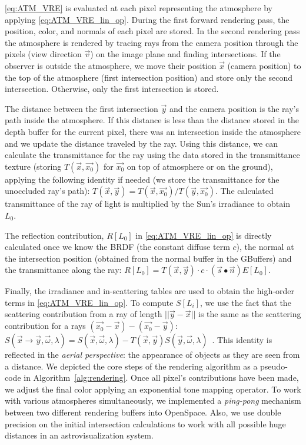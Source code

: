 \documentclass[journal]{vgtc}                %
\newcommand{\review}[1]{{\color{blue}#1}}
\begin{document}
\autoref{eq:ATM_VRE} is evaluated at each pixel representing the atmosphere by applying \autoref{eq:ATM_VRE_lin_op}. During the first forward rendering pass, the position, color, and normals of each pixel are stored. In the second rendering pass the atmosphere is rendered by tracing rays from the camera position through the pixels (view direction $\vec{v}$) on the image plane and finding intersections. If the observer is outside the atmosphere, we move their position $\vec{x}$ (camera position) to the top of the atmosphere (first intersection position) and store only the second intersection. Otherwise, only the first intersection is stored.

The distance between the first intersection $\vec{y}$ and the camera position is the ray's path inside the atmosphere. If this distance is less than the distance stored in the depth buffer for the current pixel, there was an intersection inside the atmosphere and we update the distance traveled by the ray. Using this distance, we can calculate the transmittance for the ray using the data stored in the transmittance texture (storing $T(\vec{x}, \vec{x_0})$ for $\vec{x_0}$ on top of atmosphere or on the ground), applying the following identity if needed (we store the transmittance for the unoccluded ray's path): $T(\vec{x}, \vec{y}) = T(\vec{x}, \vec{x_0}) / T(\vec{y}, \vec{x_0})$. The calculated transmittance of the ray of light is multiplied by the Sun's irradiance to obtain $L_0$.

The reflection contribution, $R[L_0]$ in \autoref{eq:ATM_VRE_lin_op} is directly calculated once we know the BRDF (the constant diffuse term $c$), the normal at the intersection position (obtained from the normal buffer in the GBuffers) and the transmittance along the ray: $R[L_0] = T(\vec{x}, \vec{y}) \cdot c \cdot (\vec{s}\bullet\vec{n})E[L_0]$.

Finally, the irradiance and in-scattering tables are used to obtain the high-order terms in \autoref{eq:ATM_VRE_lin_op}. To compute $S[L_i]$, we use \review{the fact that} the scattering contribution from a ray of length $||\vec{y}-\vec{x}||$ is the same as the scattering contribution for a rays $(\vec{x_0}-\vec{x}) - (\vec{x_0}-\vec{y})$:  $S(\vec{x}\rightarrow \vec{y}, \vec{\omega}, \lambda) = S(\vec{x}, \vec{\omega}, \lambda) - T(\vec{x}, \vec{y})S(\vec{y}, \vec{\omega}, \lambda)$~\cite{ONeil:2005, Schafhitzel:2007}. This identity is reflected in the \textit{aerial perspective}: the appearance of objects as they are seen from a distance. \review{We depicted the core steps of the rendering algorithm as a pseudo-code in Algorithm~\autoref{alg:rendering}.} \review{Once all pixel's contributions have been made, we adjust the final color applying an exponential tone mapping operator.} To work with various atmospheres simultaneously, we implemented a \textit{ping-pong} mechanism between two different rendering buffers into OpenSpace. \review{Also, we use double precision on the initial intersection calculations to work with all possible huge distances in an astrovisualization system.}
\end{document}
